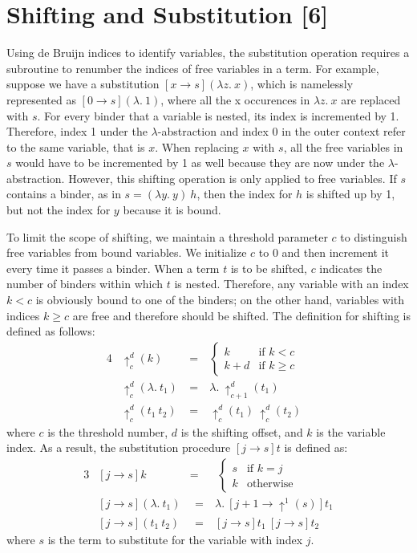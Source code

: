 \section{Shifting and Substitution [6]} 
Using de Bruijn indices to identify variables, the substitution operation requires a subroutine to renumber the indices of free variables 
in a term. For example, suppose we have a substitution $[x\rightarrow s](\lambda z. \: x)$, 
which is namelessly represented as $[0\rightarrow s](\lambda . \: 1)$, where all the x occurences in $\lambda z . \: x$ 
are replaced with $s$. For every binder that a variable is nested, its index is incremented by 1. Therefore, index 1 under the 
$\lambda$-abstraction and index 0 in the outer context refer to the same variable, that is $x$. When replacing $x$ with $s$, all the free variables 
in $s$ would have to be incremented by 1 as well because they are now under the $\lambda$-abstraction. However, this shifting 
operation is only applied to free variables. If $s$ contains a binder, as in $s = (\lambda y . \: y) \: h$, then 
the index for $h$ is shifted up by 1, but not the index for $y$ because it is bound. 

To limit the scope of shifting, we maintain a threshold parameter $c$ to distinguish free variables from bound variables. We initialize $c$ to 
0 and then increment it every time it passes a binder. When a term $t$ is to be shifted, $c$ indicates the number of binders within which $t$  
is nested. Therefore, any variable with an index $k < c$ is obviously bound to one of the binders; on the other hand, 
variables with indices $k \geq c$ are free and therefore should be shifted. The definition for shifting is defined as follows:
\begin{alignat*}{4}
&\uparrow _c^d(k) &= &  
    \begin{cases}   
        k & \text{if $k<c$} \\
        k + d & \text{if $k \geq c$} 
    \end{cases} \\
&\uparrow _c^d(\lambda . \: t_1) \: & = \: &\lambda . \: \uparrow _{c+1}^d (t_1) & \\
&\uparrow _c^d(t_1 \: t_2) \: & = \: & \uparrow _c^d(t_1) \: \uparrow _c^d(t_2)
\end{alignat*} 
where $c$ is the threshold number, $d$ is the shifting offset, and $k$ is the variable index. As a result, the substitution 
procedure $[j \rightarrow s]t$ is defined as:
\begin{alignat*}{3}
    &[j \rightarrow s]k &=& \:  
        \begin{cases}   
            s & \text{if $k=j$} \\
            k & \text{otherwise} 
        \end{cases} \\
    &[j \rightarrow s](\lambda . \: t_1) & \: \: = \: & \lambda . \: [j + 1 \rightarrow \uparrow^1 (s)]t_1 \\
    &[j \rightarrow s](t_1 \: t_2) & \: \: = \: & [j \rightarrow s]t_1 \: [j \rightarrow s]t_2
\end{alignat*} 
where $s$ is the term to substitute for the variable with index $j$.